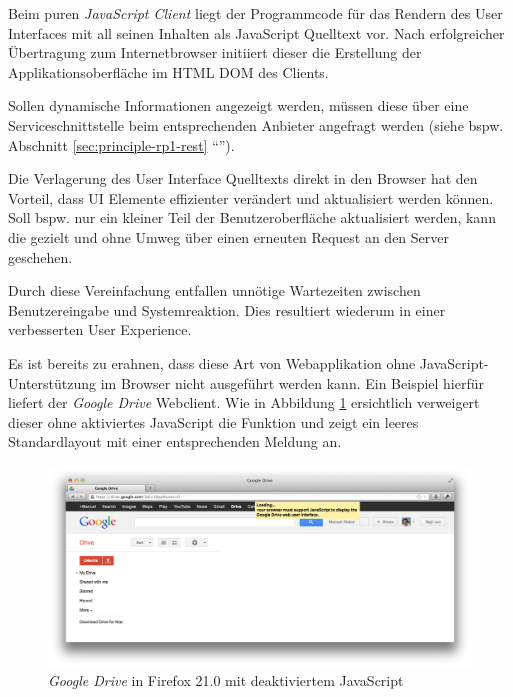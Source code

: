 Beim puren \emph{JavaScript Client} liegt der Programmcode für das Rendern des User Interfaces mit all seinen Inhalten als JavaScript Quelltext vor. Nach erfolgreicher Übertragung zum Internetbrowser initiiert dieser die Erstellung der Applikationsoberfläche im HTML \gls{DOM} des Clients.

Sollen dynamische Informationen angezeigt werden, müssen diese über eine Serviceschnittstelle beim entsprechenden Anbieter angefragt werden (siehe bspw. Abschnitt \ref{sec:principle-rp1-rest} ``'').

Die Verlagerung des User Interface Quelltexts direkt in den Browser hat den Vorteil, dass UI Elemente effizienter verändert und aktualisiert werden können. Soll bspw. nur ein kleiner Teil der Benutzeroberfläche aktualisiert werden, kann die gezielt und ohne Umweg über einen erneuten Request an den Server geschehen.

Durch diese Vereinfachung entfallen unnötige Wartezeiten zwischen Benutzereingabe und Systemreaktion. Dies resultiert wiederum in einer verbesserten User Experience.

Es ist bereits zu erahnen, dass diese Art von Webapplikation ohne JavaScript-Unterstützung im Browser nicht ausgeführt werden kann. Ein Beispiel hierfür liefert der \emph{Google Drive} \cite{GoogleDrive} Webclient. Wie in Abbildung \ref{fig:googleDriveNoJs} ersichtlich verweigert dieser ohne aktiviertes JavaScript die Funktion und zeigt ein leeres Standardlayout mit einer entsprechenden Meldung an.

\begin{figure}[H]
	\centering
	\includegraphics[width=12cm]{content/principle-demonstration/images/googledrive-nojs.png}
	\caption{\emph{Google Drive} in Firefox 21.0 mit deaktiviertem JavaScript}
	\label{fig:googleDriveNoJs}
\end{figure}

